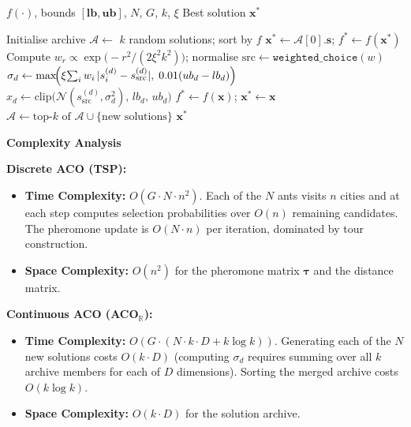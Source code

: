 \begin{algorithm}[H]
\caption{ACO --- Continuous solver (ACO$_\mathbb{R}$)}
\label{alg:aco-cont}
\begin{algorithmic}[1]
\REQUIRE $f(\cdot)$, bounds $[\mathbf{lb},\mathbf{ub}]$, $N$, $G$, $k$, $\xi$
\ENSURE Best solution $\mathbf{x}^*$

\STATE Initialise archive $\mathcal{A} \leftarrow$ $k$ random solutions; sort by $f$
\STATE $\mathbf{x}^* \leftarrow \mathcal{A}[0].\mathbf{s}$;\quad
       $f^* \leftarrow f(\mathbf{x}^*)$
  \STATE Compute $w_r \propto \exp\!\bigl(-r^2/(2\xi^2 k^2)\bigr)$; normalise 
    \STATE $\text{src} \leftarrow \texttt{weighted\_choice}(w)$
      \STATE $\sigma_d \leftarrow \max\!\Bigl(\xi\!\sum_i w_i\,|s_i^{(d)}-s_{\text{src}}^{(d)}|,\;
             0.01(ub_d-lb_d)\Bigr)$
      \STATE $x_d \leftarrow \mathrm{clip}\bigl(\mathcal{N}(s_{\text{src}}^{(d)},\sigma_d^2),\,
             lb_d,\,ub_d\bigr)$
    \ENDFOR
      \STATE $f^* \leftarrow f(\mathbf{x})$;\; $\mathbf{x}^* \leftarrow \mathbf{x}$
    \ENDIF
  \ENDFOR
  \STATE $\mathcal{A} \leftarrow \text{top-}k\text{ of }\mathcal{A}\cup\{\text{new solutions}\}$
\ENDFOR
\RETURN $\mathbf{x}^*$
\end{algorithmic}
\end{algorithm}

\textbf{Complexity Analysis}

\textbf{Discrete ACO (TSP):}
\begin{itemize}
  \item \textbf{Time Complexity:} $O(G\cdot N\cdot n^2)$. Each of the $N$ ants visits $n$
        cities and at each step computes selection probabilities over $O(n)$ remaining
        candidates. The pheromone update is $O(N\cdot n)$ per iteration, dominated by tour
        construction.
  \item \textbf{Space Complexity:} $O(n^2)$ for the pheromone matrix $\boldsymbol{\tau}$ and
        the distance matrix.
\end{itemize}

\textbf{Continuous ACO (ACO$_\mathbb{R}$):}
\begin{itemize}
  \item \textbf{Time Complexity:} $O(G\cdot(N\cdot k\cdot D + k\log k))$. Generating each of
        the $N$ new solutions costs $O(k\cdot D)$ (computing $\sigma_d$ requires summing over
        all $k$ archive members for each of $D$ dimensions). Sorting the merged archive costs
        $O(k\log k)$.
  \item \textbf{Space Complexity:} $O(k\cdot D)$ for the solution archive.
\end{itemize}

